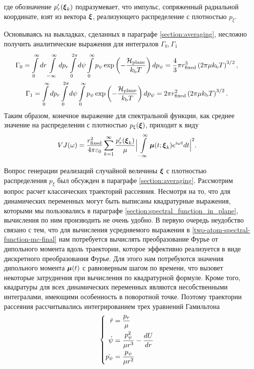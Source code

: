 %
где обозначение $p_r^\prime(\boldsymbol{\xi}_k)$ подразумевает, что импульс, сопряженный радиальной координате, взят из вектора $\boldsymbol{\xi}$, реализующего распределение с плотностью $p_\xi$. \par
Основываясь на выкладках, сделанных в параграфе \ref{section:averaging}, несложно получить аналитические выражения для интегралов $\Gamma_0, \Gamma_1$
\begin{gather}
    \Gamma_0 = \int\limits_0^\infty dr \int\limits_{-\infty}^\infty dp_r \int\limits_0^{2\pi} d\psi \int\limits_0^\infty p_\psi \exp \left( -\frac{\mathcal{H}_\text{plane}}{k_\text{b} T} \right) d p_\psi = \frac{4}{3} \pi r_\text{fixed}^3 \left( 2 \pi \mu k_\text{b} T \right)^{3/2}, \\
    \Gamma_1 = \int\limits_0^\infty dp_r \int\limits_0^{2\pi} d\psi \int\limits_0^\infty p_\psi \exp \left( -\frac{\mathcal{H}_\text{plane}}{k_\text{b} T} \right) dp_\psi  = 2 \pi r_\text{fixed}^2 \left( 2 \pi \mu k_\text{b} T \right)^{3/2}.
\end{gather}
Таким образом, конечное выражение для спектральной функции, как среднее значение на распределении с плотностью $p_\xi(\boldsymbol{\xi})$, приходит к виду
\begin{gather}
    VJ(\omega) = \frac{r_\text{fixed}^2}{4 \pi \varepsilon_0} \sum_{k = 1}^\infty \frac{p_r^\prime(\boldsymbol{\xi}_k)}{\mu} \Big\vert \int\limits_{-\infty}^\infty \boldsymbol{\mu}(t; \boldsymbol{\xi}_k) e^{i \omega t} dt \Big\vert^2. \label{two-atom-spectral-function-mc-final}
\end{gather}

Вопрос генерации реализаций случайной величины $\boldsymbol{\xi}$ с плотностью распределения $p_\xi$ был обсужден в параграфе \ref{section:averaging}. Рассмотрим вопрос расчет классических траекторий рассеяния. Несмотря на то, что для динамических переменных могут быть выписаны квадратурные выражения, которыми мы пользовались в параграфе \ref{section:spectral_function_in_plane}, вычисления по ним производить не очень удобно. В первую очередь неудобство связано с тем, что для вычисления усредняемого выражения в \eqref{two-atom-spectral-function-mc-final} нам потребуется вычислять преобразование Фурье от дипольного момента вдоль траектории, которое эффективно реализуется в виде дискретного преобразования Фурье. Для этого нам потребуются значения дипольного момента $\boldsymbol{\mu}(t)$ с равноверным шагом по времени, что вызовет некоторые затруднения при вычисления по квадратурной формуле. Кроме того, квадратуры для всех динамических переменных являются несобственными интегралами, имеющими особенность в поворотной точке. Поэтому траектории рассеяния рассчитывались интегрированием трех уравнений Гамильтона
\begin{gather}
    \left\{
    \begin{aligned}
        \dot{r} &= \frac{p_r}{\mu} \\
        \dot{\psi} &= \frac{p_\psi^2}{\mu r^3} - \frac{d U}{d r} \\
        \dot{p_\psi} &= \frac{p_\psi}{\mu r^2}
    \end{aligned}
    \right. \label{two-atom-hamilton-equations}
\end{gather}

